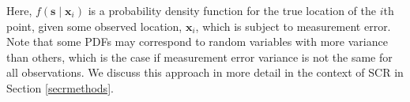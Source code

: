 \documentclass[useAMS,usenatbib,referee]{biom}
\begin{document}
Here, $f(\bm{s} \mid \bm{x}_i)$ is a probability density function for the true location of the $i$th point, given some observed location, $\bm{x}_i$, which is subject to measurement error. Note that some PDFs may correspond to random variables with more variance than others, which is the case if measurement error variance is not the same for all observations. We discuss this approach in more detail in the context of SCR in Section \ref{secrmethods}.


\end{document}
